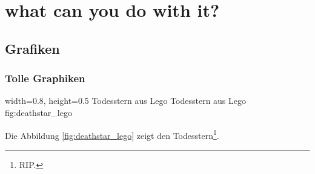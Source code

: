\chapter{what can you do with it?}

\section{Grafiken}

\subsection{Tolle Graphiken}

    {width=0.8\textwidth, height=0.5\textheight} %
    {Todesstern aus Lego}   %
    {Todesstern aus Lego}   %
    {fig:deathstar_lego}    %

Die Abbildung \ref{fig:deathstar_lego} zeigt den Todesstern\footnote{RIP.}.